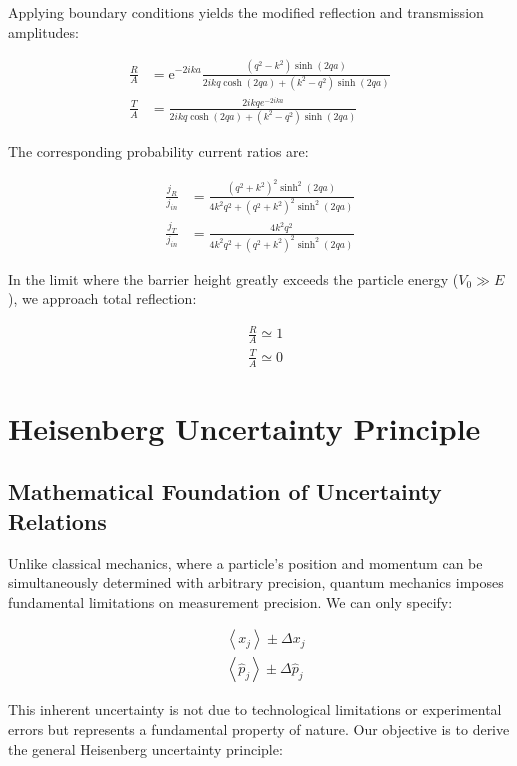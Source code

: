 \documentclass[italian]{HKNdocument}
\begin{document}
Applying boundary conditions yields the modified reflection and transmission amplitudes:

\begin{align}
\frac{R}{A} & =\mathrm{e}^{-2 i k a} \frac{\left(q^{2}-k^{2}\right) \sinh (2 q a)}{2 i k q \cosh (2 q a)+\left(k^{2}-q^{2}\right) \sinh (2 q a)} \\
\frac{T}{A} & =\frac{2 i k q e^{-2 i k a}}{2 i k q \cosh (2 q a)+\left(k^{2}-q^{2}\right) \sinh (2 q a)}
\end{align}

The corresponding probability current ratios are:

\begin{align}
\frac{j_{R}}{j_{i n}} & =\frac{\left(q^{2}+k^{2}\right)^{2} \sinh ^{2}(2 q a)}{4 k^{2} q^{2}+\left(q^{2}+k^{2}\right)^{2} \sinh ^{2}(2 q a)}  \\
\frac{j_{T}}{j_{i n}} & =\frac{4 k^{2} q^{2}}{4 k^{2} q^{2}+\left(q^{2}+k^{2}\right)^{2} \sinh ^{2}(2 q a)}
\end{align}

In the limit where the barrier height greatly exceeds the particle energy ($V_0 \gg E$), we approach total reflection:

\begin{align}
& \frac{R}{A} \simeq 1  \\
& \frac{T}{A} \simeq 0
\end{align}

\section{Heisenberg Uncertainty Principle}
\subsection{Mathematical Foundation of Uncertainty Relations}

Unlike classical mechanics, where a particle's position and momentum can be simultaneously determined with arbitrary precision, quantum mechanics imposes fundamental limitations on measurement precision. We can only specify:

\begin{align}
& \left\langle x_{j}\right\rangle \pm \Delta x_{j} \\
& \left\langle\hat{p}_{j}\right\rangle \pm \Delta \hat{p}_{j}
\end{align}

This inherent uncertainty is not due to technological limitations or experimental errors but represents a fundamental property of nature. Our objective is to derive the general Heisenberg uncertainty principle:
\end{document}
